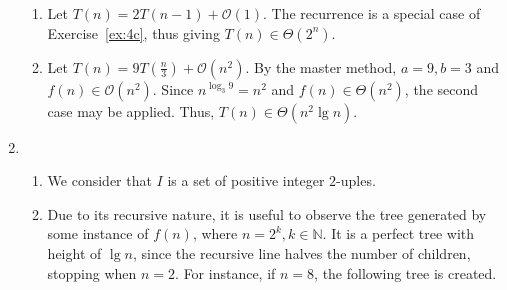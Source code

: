 \documentclass[12pt]{article}
\begin{document}
\begin{enumerate}
\begin{enumerate}
        \item Let $T(n) = 2T(n - 1) + \mathcal{O}(1)$. The recurrence is a special case of Exercise~\ref{ex:4c}, thus giving $T(n) \in \Theta(2^{n})$.
        \item Let $T(n) = 9T(\frac{n}{3}) + \mathcal{O}(n^{2})$. By the master method, $a = 9, b = 3$ and $f(n) \in \mathcal{O}(n^{2})$. Since $n^{\log_{3} 9} = n^{2}$ and $f(n) \in \Theta(n^{2})$, the second case may be applied. Thus, $T(n) \in \Theta(n^{2} \lg n)$.
    \end{enumerate}
    \item
    \begin{enumerate}
        \item We consider that $I$ is a set of positive integer $2$-uples.
        \item Due to its recursive nature, it is useful to observe the tree generated by some instance of $f(n)$, where $n = 2^{k}, k \in \mathbb{N}$. It is a perfect tree with height of $\lg n$, since the recursive line halves the number of children, stopping when $n = 2$. For instance, if $n = 8$, the following tree is created.
        \begin{figure}[htbp]
          \centering
        \end{figure}

\end{enumerate}
\end{enumerate}
\end{document}

